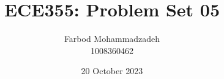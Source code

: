 \documentclass{article}
\title{ECE355: Problem Set 05}
\author{Farbod Mohammadzadeh\\
    1008360462}
\date{20 October 2023}
\begin{document}
\Large
\maketitle
\newpage

\newpage

\newpage

\newpage

\newpage

\end{document}
